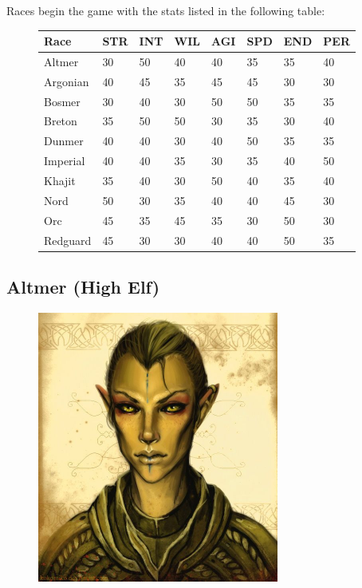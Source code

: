 \documentclass[12pt]{book}
\begin{document}
Races begin the game with the stats listed in the following table:
\begin{figure}[h]
\begin{tabular}[h]{|p{}|p{}p{}p{}p{}p{}p{}p{}|}
	\hline
	\textbf{Race} & STR & INT & WIL & AGI & SPD & END & PER\\
	\hline
	Altmer & 30 & 50 & 40 & 40 & 35 & 35 & 40\\
	\hline
	Argonian & 40 & 45 & 35 & 45 & 45 & 30 & 30\\
	\hline
	Bosmer & 30 & 40 & 30 & 50 & 50 & 35 & 35\\
	\hline
	Breton & 35 & 50 & 50 & 30 & 35 & 30 & 40\\
	\hline
	Dunmer & 40 & 40 & 30 & 40 & 50 & 35 & 35\\
	\hline
	Imperial & 40 & 40 & 35 & 30 & 35 & 40 & 50\\
	\hline
	Khajit & 35 & 40 & 30 & 50 & 40 & 35 & 40\\
	\hline
	Nord & 50 & 30 & 35 & 40 & 40 & 45 & 30\\
	\hline
	Orc & 45 & 35 & 45 & 35 & 30 & 50 & 30\\
	\hline
	Redguard & 45 & 30 & 30 & 40 & 40 & 50 & 35\\
	\hline
\end{tabular}
\end{figure}

\subsection{Altmer (High Elf)}
\begin{figure}
	\includegraphics[width=\textwidth]{Altmer.png}
\end{figure}
\end{document}
